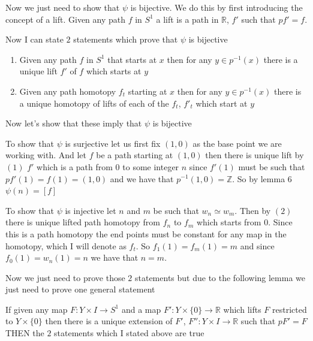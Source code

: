 \documentclass[paper=a4,fontsize=paper,12.5pt]{book}
\newcommand{\3}{\vspace*{3mm}}
\newcommand{\Z}{\mathbb{Z}}
\newcommand{\R}{\mathbb{R}}
\newcommand{\C}[1]{{S}^{#1}}
\begin{document}
\newpage

Now we just need to show that $\psi$ is bijective. We do this by first introducing the concept of a lift. Given any path $f$ in $\C{1}$ a lift is a path in $\R$, $f'$ such that $pf' = f$.

\3

Now I can state $2$ statements which prove that $\psi$ is bijective

\begin{enumerate}

\item Given any path $f$ in $\C{1}$ that starts at $x$ then for any $y \in {p}^{-1}(x)$ there is a unique lift $f'$ of $f$ which starts at $y$

\item Given any path homotopy ${f}_{t}$ starting at $x$ then for any $y \in {p}^{-1}(x)$ there is a unique homotopy of lifts of each of the ${f}_{t}$, ${f'}_{t}$ which start at $y$

\end{enumerate}

\3

Now let's show that these imply that $\psi$ is bijective

\3

To show that $\psi$ is surjective let us first fix $(1,0)$ as the base point we are working with. And let $f$ be a path starting at $(1,0)$ then there is unique lift by $(1)$ $f'$ which is a path from $0$ to some integer $n$ since $f'(1)$ must be such that $pf'(1) = f(1) = (1,0)$ and we have that $ {p}^{-1}(1,0) = \Z$. So by lemma $6$ $\psi(n) = [f]$

\3

To show that $\psi$ is injective let $n$ and $m$ be such that ${w}_{n} \simeq {w}_{m}$. Then by $(2)$ there is unique lifted path homotopy from ${f}_{n}$ to ${f}_{m}$ which starts from $0$. Since this is a path homotopy the end points must be constant for any map in the homotopy, which I will denote as ${f}_{t}$. So ${f}_{1}(1) = {f}_{m}(1) = m$ and since ${f}_{0}(1) = {w}_{n}(1) = n$ we have that $n = m$.

\3

Now we just need to prove those $2$ statements but due to the following lemma we just need to prove one general statement


\begin{lemma}

If given any map $F: Y \times I \to \C{1}$ and a map $F': Y \times \{0\} \to \R$ which lifts $F$ restricted to $Y \times \{0\}$ then there is a unique extension of $F'$, $F'': Y \times I \to \R$ such that  $pF' = F$ THEN the $2$ statements which I stated above are true
 

\end{lemma}
\end{document}
